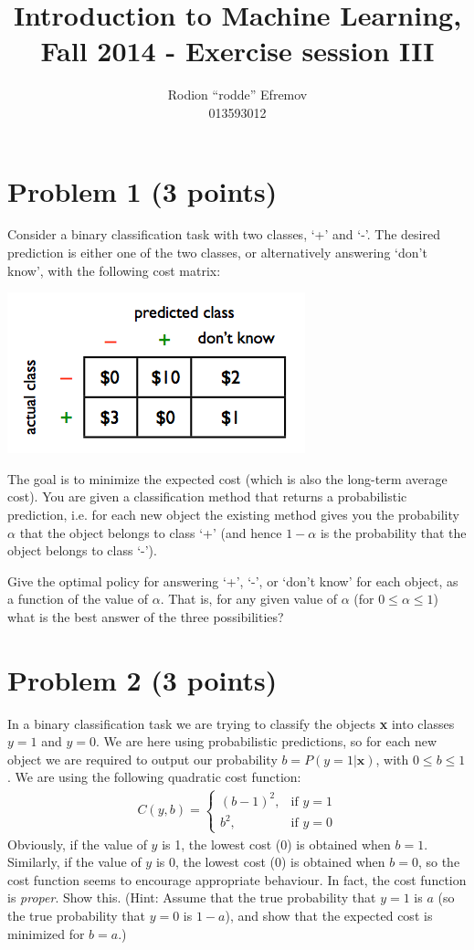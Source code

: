 \documentclass[10pt]{article}
\title{Introduction to Machine Learning, Fall 2014 - Exercise session III}
\author{Rodion ``rodde'' Efremov \\ 013593012}
\begin{document}
 \maketitle

\color{blue}
\section*{Problem 1 (3 points)}
Consider a binary classification task with two classes, `+' and `-'. The desired prediction is either one of the two classes, or alternatively answering `don't know', with the following cost matrix:
\begin{center}
\includegraphics{cost_table}
\end{center}
The goal is to minimize the expected cost (which is also the long-term average cost). You are given a classification method that returns a probabilistic prediction, i.e. for each new object the existing method gives you the probability $\alpha$ that the object belongs to class `+' (and hence $1 - \alpha$ is the probability that the object belongs to class `-').
 
Give the optimal policy for answering `+', `-', or `don't know' for each object, as a function of the value of $\alpha$. That is, for any given value of $\alpha$ (for $0 \leq \alpha \leq 1$) what is the best answer of the three possibilities?

\color{blue}
\section*{Problem 2 (3 points)}
In a binary classification task we are trying to classify the objects \textbf{x} into classes $y = 1$ and $y = 0$. We are here using probabilistic predictions, so for each new object we are required to output our probability $b = P(y = 1 | \textbf{x})$, with $0 \leq b \leq 1$. We are using the following quadratic cost function:
\begin{align}
C(y, b) = 
\begin{cases}
(b - 1)^2,  & \mbox{if } y = 1\\
b^2,          & \mbox{if } y = 0
\end{cases}
\end{align}
Obviously, if the value of $y$ is 1, the lowest cost (0) is obtained when $b = 1$. Similarly, if the value of $y$ is 0, the lowest cost (0) is obtained when $b = 0$, so the cost function seems to encourage appropriate behaviour. In fact, the cost function is \textit{proper}. Show this. (Hint: Assume that the true probability that $y = 1$ is $a$ (so the true probability that $y = 0$ is $1 - a$), and show that the expected cost is minimized for $b = a$.)
\end{document}
